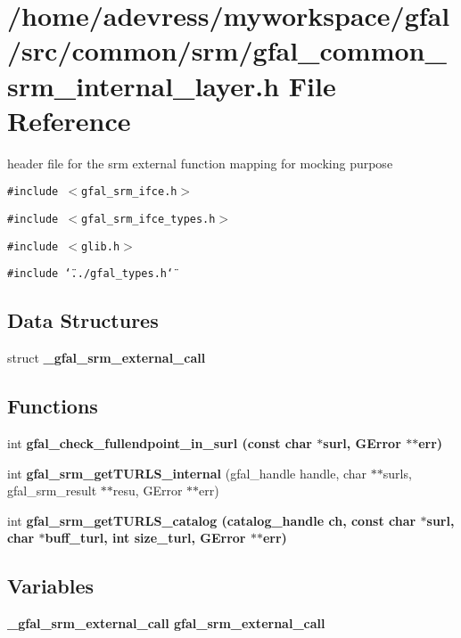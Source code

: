 \section{/home/adevress/myworkspace/gfal/src/common/srm/gfal\_\-common\_\-srm\_\-internal\_\-layer.h File Reference}
\label{gfal__common__srm__internal__layer_8h}
header file for the srm external function mapping for mocking purpose 

{\tt \#include $<$gfal\_\-srm\_\-ifce.h$>$}\par
{\tt \#include $<$gfal\_\-srm\_\-ifce\_\-types.h$>$}\par
{\tt \#include $<$glib.h$>$}\par
{\tt \#include \char`\"{}../gfal\_\-types.h\char`\"{}}\par
\subsection*{Data Structures}
\begin{CompactItemize}
\item 
struct \bf{\_\-gfal\_\-srm\_\-external\_\-call}
\end{CompactItemize}
\subsection*{Functions}
\begin{CompactItemize}
\item 
int \bf{gfal\_\-check\_\-fullendpoint\_\-in\_\-surl} (const char $\ast$surl, GError $\ast$$\ast$err)
\item 
int \textbf{gfal\_\-srm\_\-get\-TURLS\_\-internal} (gfal\_\-handle handle, char $\ast$$\ast$surls, gfal\_\-srm\_\-result $\ast$$\ast$resu, GError $\ast$$\ast$err)\label{gfal__common__srm__internal__layer_8h_07842f2edba0cfe563392ac479102b34}

\item 
int \bf{gfal\_\-srm\_\-get\-TURLS\_\-catalog} (catalog\_\-handle ch, const char $\ast$surl, char $\ast$buff\_\-turl, int size\_\-turl, GError $\ast$$\ast$err)
\end{CompactItemize}
\subsection*{Variables}
\begin{CompactItemize}
\item 
\bf{\_\-gfal\_\-srm\_\-external\_\-call} \textbf{gfal\_\-srm\_\-external\_\-call}\label{gfal__common__srm__internal__layer_8h_67b12c7342043451fc5ce31b1a3d74fb}

\end{CompactItemize}



